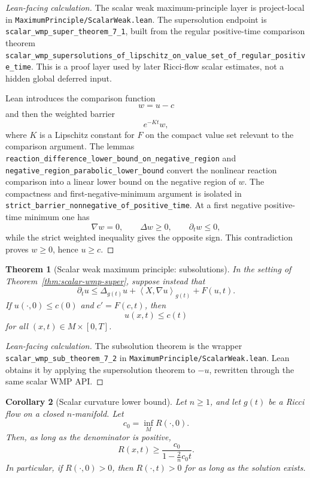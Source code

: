 \documentclass[11pt]{article}
\theoremstyle{plain}
\newtheorem{theorem}{Theorem}[section]
\newtheorem{corollary}[theorem]{Corollary}
\theoremstyle{definition}
\theoremstyle{remark}
\newcommand{\ip}[2]{\left\langle #1,#2\right\rangle}
\newcommand{\leanref}[1]{\nolinkurl{#1}}
\newcommand{\leanfile}[1]{\nolinkurl{#1}}
\newcommand{\rffile}[1]{\leanfile{#1}}
\begin{document}
\begin{proof}[Lean-facing calculation]
The scalar weak maximum-principle layer is project-local in
\rffile{MaximumPrinciple/ScalarWeak.lean}.  The supersolution endpoint is
\leanref{scalar_wmp_super_theorem_7_1}, built from the regular positive-time
comparison theorem
\leanref{scalar_wmp_supersolutions_of_lipschitz_on_value_set_of_regular_positive_time}.
This is a proof layer used by later Ricci-flow scalar estimates, not a hidden
global deferred input.

Lean introduces the comparison function
\[
  w=u-c
\]
and then the weighted barrier
\[
  e^{-Kt}w,
\]
where $K$ is a Lipschitz constant for $F$ on the compact value set relevant to
the comparison argument.  The lemmas
\leanref{reaction_difference_lower_bound_on_negative_region} and
\leanref{negative_region_parabolic_lower_bound} convert the nonlinear reaction
comparison into a linear lower bound on the negative region of $w$.  The
compactness and first-negative-minimum argument is isolated in
\leanref{strict_barrier_nonnegative_of_positive_time}.  At a first negative
positive-time minimum one has
\[
  \nabla w=0,
  \qquad
  \Delta w\ge0,
  \qquad
  \partial_tw\le0,
\]
while the strict weighted inequality gives the opposite sign.  This
contradiction proves $w\ge0$, hence $u\ge c$.
\end{proof}

\begin{theorem}[Scalar weak maximum principle: subsolutions]
\label{thm:scalar-wmp-sub}
In the setting of Theorem~\ref{thm:scalar-wmp-super}, suppose instead that
\[
\partial_tu
\le
\Delta_{g(t)}u+
\ip{X}{\nabla u}_{g(t)}+F(u,t).
\]
If $u(\cdot,0)\le c(0)$ and $c'=F(c,t)$, then
\[
u(x,t)\le c(t)
\]
for all $(x,t)\in M\times[0,T]$.
\end{theorem}

\begin{proof}[Lean-facing calculation]
The subsolution theorem is the wrapper
\leanref{scalar_wmp_sub_theorem_7_2} in
\rffile{MaximumPrinciple/ScalarWeak.lean}.  Lean obtains it by applying the
supersolution theorem to $-u$, rewritten through the same scalar WMP API.
\end{proof}

\begin{corollary}[Scalar curvature lower bound]
\label{cor:scalar-lower-bound}
Let $n\ge1$, and let $g(t)$ be a Ricci flow on a closed $n$-manifold. Let
\[
c_0=\inf_MR(\cdot,0).
\]
Then, as long as the denominator is positive,
\[
R(x,t)
\ge
\frac{c_0}{1-\frac2n c_0t}.
\]
In particular, if $R(\cdot,0)>0$, then $R(\cdot,t)>0$ for as long as the
solution exists.
\end{corollary}
\end{document}
